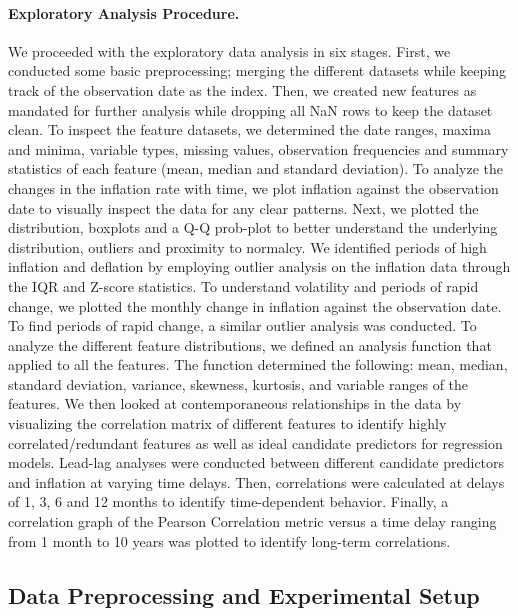 \documentclass{article}
\begin{document}
\paragraph{Exploratory Analysis Procedure.}
We proceeded with the exploratory data analysis in six stages. First, we conducted some basic preprocessing; merging the different datasets while keeping track of the observation date as the index. Then, we created new features as mandated for further analysis while dropping all NaN rows to keep the dataset clean. To inspect the feature datasets, we determined the date ranges, maxima and minima, variable types, missing values, observation frequencies and summary statistics of each feature (mean, median and standard deviation). To analyze the changes in the inflation rate with time, we plot inflation against the observation date to visually inspect the data for any clear patterns. Next, we plotted the distribution, boxplots and a Q-Q prob-plot to better understand the underlying distribution, outliers and proximity to normalcy. We identified periods of high inflation and deflation by employing outlier analysis on the inflation data through the IQR and Z-score statistics. To understand volatility and periods of rapid change, we plotted the monthly change in inflation against the observation date. To find periods of rapid change, a similar outlier analysis was conducted. To analyze the different feature distributions, we defined an analysis function that applied to all the features. The function determined the following: mean, median, standard deviation, variance, skewness, kurtosis, and variable ranges of the features. We then looked at contemporaneous relationships in the data by visualizing the correlation matrix of different features to identify highly correlated/redundant features as well as ideal candidate predictors for regression models. Lead-lag analyses were conducted between different candidate predictors and inflation at varying time delays. Then, correlations were calculated at delays of 1, 3, 6 and 12 months to identify time-dependent behavior. Finally, a correlation graph of the Pearson Correlation metric versus a time delay ranging from 1 month to 10 years was plotted to identify long-term correlations.

\subsection{Data Preprocessing and Experimental Setup}
\end{document}
